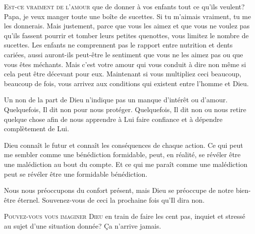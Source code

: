 \lettrine{E}{st-ce vraiment de l'amour} que de donner à vos enfants
 tout ce qu'ils veulent?
 \og Papa, je veux manger toute une boîte de sucettes.
 Si tu m'aimais vraiment, tu me les donnerais. \fg{}
 Mais justement, parce que vous les aimez et que vous ne voulez pas
 qu'ils fassent pourrir et tomber leurs petites quenottes,
 vous limitez le nombre de sucettes.
 Les enfants ne comprennent pas le rapport entre nutrition et dents cariées,
 aussi auront-ils peut-être le sentiment que vous ne les aimez pas
 ou que vous êtes méchants. Mais c'est votre amour qui vous conduit à dire
 \og non \fg{} même si cela peut être décevant pour eux.
 Maintenant si vous multipliez ceci beaucoup, beaucoup de fois,
 vous arrivez aux conditions qui existent entre l'homme et Dieu. 


Un \og non \fg{} de la part de Dieu n'indique pas un 
 manque d'intérêt ou d'amour.
 Quelquefois, Il dit \og non \fg{} pour nous protéger.
 Quelquefois, Il dit \og non \fg{} ou nous retire quelque chose
 afin de nous apprendre à Lui faire confiance
 et à dépendre complètement de Lui. 

Dieu connaît le futur et connaît les conséquences de chaque action.
 Ce qui peut me sembler comme une bénédiction formidable, peut,
 en réalité, se révéler être une malédiction au bout du compte.
 Et ce qui me paraît comme une malédiction peut se révéler
 être une formidable bénédiction. 

Nous nous préoccupons du confort présent, mais Dieu se préoccupe
 de notre bien-être éternel.
 Souvenez-vous de ceci la prochaine fois qu'Il dira \og non. \fg{}

\dvrule






\lettrine{P}{ouvez-vous vous imaginer Dieu} en train de faire les cent pas,
 inquiet et stressé au sujet d'une situation donnée? Ça n'arrive jamais. 

